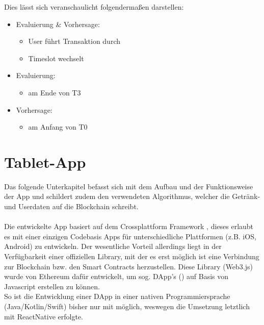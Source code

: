 Dies lässt sich veranschaulicht folgendermaßen darstellen:
\begin{itemize}
	\item Evaluierung \& Vorhersage: 
	\begin{itemize}
		\item User führt Transaktion durch
		\item Timeslot wechselt
	\end{itemize}
	\item Evaluierung:
	\begin{itemize}
		\item am Ende von T3
	\end{itemize}
	\item Vorhersage:
	\begin{itemize}
		\item am Anfang von T0
	\end{itemize}
\end{itemize}    


\section{Tablet-App}
\label{sec:app}

Das folgende Unterkapitel befasst sich mit dem Aufbau und der Funktionsweise der App und schildert zudem den verwendeten Algorithmus, welcher die Getränk- und Userdaten auf die Blockchain schreibt.\\\\
Die entwickelte App basiert auf dem Crossplattform Framework  \cite{RN:ReactNative}, dieses erlaubt es mit einer einzigen Codebasis Apps für unterschiedliche Plattformen (z.B. iOS, Android) zu entwickeln. Der wesentliche Vorteil allerdings liegt in der Verfügbarkeit einer offiziellen Library, mit der es erst möglich ist eine Verbindung zur Blockchain bzw. den Smart Contracts herzustellen. Diese Library (Web3.js) wurde von Ethereum dafür entwickelt, um sog. DApp's () \cite{DApp} auf Basis von Javascript erstellen zu können. \\
So ist die Entwicklung einer DApp in einer nativen Programmiersprache (Java/Kotlin/Swift) bisher nur mit  möglich, weswegen die Umsetzung letztlich mit ReactNative erfolgte.

